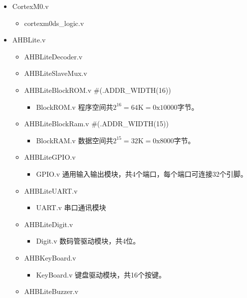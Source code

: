 \begin{itemize}
    \ttfamily%
    \item CortexM0.v 
    \begin{itemize}
        \item cortexm0ds\_logic.v
    \end{itemize}
    \item AHBLite.v 
    \begin{itemize}
        \item AHBLiteDecoder.v 
        \item AHBLiteSlaveMux.v 
        \item AHBLiteBlockROM.v \#(.ADDR\_WIDTH(16))
        \begin{itemize}
            \item BlockROM.v  \textnormal{\small 程序空间共$2^{16}=64\mathrm{K}=0\mathrm{x}10000$字节}。
        \end{itemize}
        \item AHBLiteBlockRam.v \#(.ADDR\_WIDTH(15))
        \begin{itemize}
            \item BlockRAM.v  \textnormal{\small 数据空间共$2^{15}=32\mathrm{K}=0\mathrm{x}8000$字节}。
        \end{itemize}
        \item AHBLiteGPIO.v 
        \begin{itemize}
            \item GPIO.v  \textnormal{\small 通用输入输出模块，共4个端口，每个端口可连接32个引脚。}
        \end{itemize}
        \item AHBLiteUART.v 
        \begin{itemize}
            \item UART.v  \textnormal{\small 串口通讯模块}
        \end{itemize}
        \item AHBLiteDigit.v 
        \begin{itemize}
            \item Digit.v  \textnormal{\small 数码管驱动模块，共4位。}
        \end{itemize}
        \item AHBKeyBoard.v 
        \begin{itemize}
            \item KeyBoard.v  \textnormal{\small 键盘驱动模块，共16个按键。}
        \end{itemize}
        \item AHBLiteBuzzer.v 

\end{itemize}
\end{itemize}
